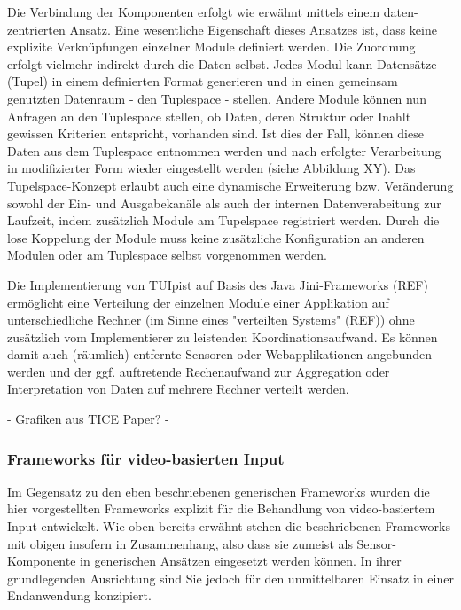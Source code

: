 Die Verbindung der Komponenten erfolgt wie erwähnt mittels einem daten-zentrierten Ansatz. Eine wesentliche Eigenschaft dieses Ansatzes ist, dass keine explizite Verknüpfungen einzelner Module definiert werden. Die Zuordnung erfolgt vielmehr indirekt durch die Daten selbst. Jedes Modul kann Datensätze (Tupel) in einem definierten Format generieren und in einen gemeinsam genutzten Datenraum - den Tuplespace - stellen. Andere Module können nun Anfragen an den Tuplespace stellen, ob Daten, deren Struktur oder Inahlt gewissen Kriterien entspricht, vorhanden sind. Ist dies der Fall, können diese Daten aus dem Tuplespace entnommen werden und nach erfolgter Verarbeitung in modifizierter Form wieder eingestellt werden (siehe Abbildung XY). Das Tupelspace-Konzept erlaubt auch eine dynamische Erweiterung bzw. Veränderung sowohl der Ein- und Ausgabekanäle als auch der internen Datenverabeitung zur Laufzeit, indem zusätzlich Module am Tupelspace registriert werden. Durch die lose Koppelung der Module muss keine zusätzliche Konfiguration an anderen Modulen oder am Tuplespace selbst vorgenommen werden.

Die Implementierung von TUIpist auf Basis des Java Jini-Frameworks (REF) ermöglicht eine Verteilung der einzelnen Module einer Applikation auf unterschiedliche Rechner (im Sinne eines "verteilten Systems" (REF)) ohne zusätzlich vom Implementierer zu leistenden Koordinationsaufwand. Es können damit auch (räumlich) entfernte Sensoren oder Webapplikationen angebunden werden und der ggf. auftretende Rechenaufwand zur Aggregation oder Interpretation von Daten auf mehrere Rechner verteilt werden.

- Grafiken aus TICE Paper? -



\subsubsection{Frameworks für video-basierten Input} %
\label{ssub:frameworks_für_video_basierten_input}

Im Gegensatz zu den eben beschriebenen generischen Frameworks wurden die hier vorgestellten Frameworks explizit für die Behandlung von video-basiertem Input entwickelt. Wie oben bereits erwähnt stehen die beschriebenen Frameworks mit obigen insofern in Zusammenhang, also dass sie zumeist als Sensor-Komponente in generischen Ansätzen eingesetzt werden können. In ihrer grundlegenden Ausrichtung sind Sie jedoch für den unmittelbaren Einsatz in einer Endanwendung konzipiert.

